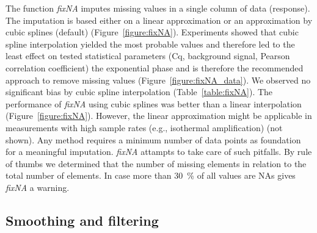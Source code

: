 \documentclass[twocolumn]{bmcart}%
\begin{document}
  The function \textsl{fixNA} imputes missing values in a single column 
of data (response). The imputation is based either on a linear approximation or an 
approximation by cubic splines (default) (Figure~\ref{figure:fixNA}). 
Experiments showed that cubic spline interpolation yielded the most probable 
values and therefore led to the least effect on tested statistical parameters 
(Cq, background signal, Pearson correlation coefficient) the exponential phase 
and is therefore the recommended approach to remove missing values 
(Figure~\ref{figure:fixNA_data}). We observed no significant bias by cubic spline 
interpolation (Table~\ref{table:fixNA}). The performance of \textsl{fixNA} using 
cubic splines was better than a linear interpolation (Figure~\ref{figure:fixNA}). 
However, the linear approximation might be applicable in measurements with high 
sample rates (e.g., isothermal amplification) (not shown). Any method requires a 
minimum number of data points as foundation for a meaningful imputation. 
\textsl{fixNA} attampts to take care of such pitfalls. By rule of thumbs we 
determined that the number of missing elements in relation to the total number 
of elements. In case more than 30~\% of all values are NAs gives \textsl{fixNA} 
a warning.

\subsection*{Smoothing and filtering}
\end{document}
